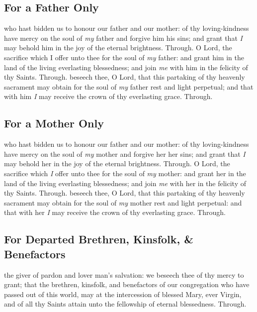 \begin{multicols}{2}
   \newcolumn

\subsection{For a Father Only}
\collect
{} who hast bidden us to honour our father and our mother: of thy loving-kindness have mercy on the soul of \textit{my} father and forgive him his sins; and grant that \textit{I} may behold him in the joy of the eternal brightness. Through.
\secret
{} O Lord, the sacrifice which I offer unto thee for the soul of \textit{my} father: and grant him in the land of the living everlasting blessedness; and join \textit{me} with him in the felicity of thy Saints. Through.
\postcommunion
{} beseech thee, O Lord, that this partaking of thy heavenly sacrament may obtain for the soul of \textit{my} father rest and light perpetual; and that with him \textit{I} may receive the crown of thy everlasting grace. Through.

\subsection{For a Mother Only}
\collect
{} who hast bidden us to honour our father and our mother: of thy loving-kindness have mercy on the soul of \textit{my} mother and forgive her her sins; and grant that \textit{I} may behold her in the joy of the eternal brightness. Through.
\secret
{} O Lord, the sacrifice which \textit{I} offer unto thee for the soul of \textit{my} mother: and grant her in the land of the living everlasting blessedness; and join \textit{me} with her in the felicity of thy Saints. Through.
\postcommunion
{} beseech thee, O Lord, that this partaking of thy heavenly sacrament may obtain for the soul of \textit{my} mother rest and light perpetual: and that with her \textit{I} may receive the crown of thy everlasting grace. Through.

\subsection{For Departed Brethren, Kinsfolk, \& Benefactors}
\collect
{} the giver of pardon and lover man's salvation: we beseech thee of thy mercy to grant; that the brethren, kinsfolk, and benefactors of our congregation who have passed out of this world, may at the intercession of blessed Mary, ever Virgin, and of all thy Saints attain unto the fellowship of eternal blessedness. Through.


\end{multicols}
